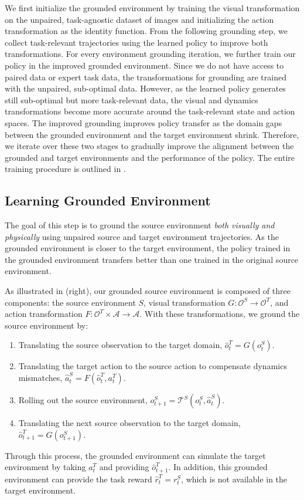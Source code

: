 We first initialize the grounded environment by training the visual transformation on the unpaired, task-agnostic dataset of images and initializing the action transformation as the identity function. From the following grounding step, we collect task-relevant trajectories using the learned policy to improve both transformations. For every environment grounding iteration, we further train our policy in the improved grounded environment.
Since we do not have access to paired data or expert task data, the transformations for grounding are trained with the unpaired, sub-optimal data. However, as the learned policy generates still sub-optimal but more task-relevant data, the visual and dynamics transformations become more accurate around the task-relevant state and action spaces. The improved grounding improves policy transfer as the domain gaps between the grounded environment and the target environment shrink. Therefore, we iterate over these two stages to gradually improve the alignment between the grounded and target environments and the performance of the policy. The entire training procedure is outlined in .


\subsection{Learning Grounded Environment}
\label{sec:grounded_environment}

The goal of this step is to ground the source environment \textit{both visually and physically} using unpaired source and target environment trajectories. 
As the grounded environment is closer to the target environment, the policy trained in the grounded environment transfers better than one trained in the original source environment.

As illustrated in  (right), our grounded source environment is composed of three components: the source environment $S$, visual transformation $G: \mathcal{O}^S \rightarrow \mathcal{O}^T$, and action transformation $F: \mathcal{O}^T \times \mathcal{A} \rightarrow \mathcal{A}$. 
With these transformations, we ground the source environment by:
\begin{enumerate}[label=(\arabic*)]
\item Translating the source observation to the target domain, $\hat{o}_t^T = G(o_t^S)$.
\item Translating the target action to the source action to compensate dynamics mismatches, $\hat{a}_t^S = F(\hat{o}_t^T, a_t^T)$.
\item Rolling out the source environment, $o_{t+1}^S = \mathcal{T}^S(o_t^S, \hat{a}_t^S)$. 
\item Translating the next source observation to the target domain, $\hat{o}_{t+1}^T = G(o_{t+1}^S)$. 
\end{enumerate}
Through this process, the grounded environment can simulate the target environment by taking $a_t^T$ and providing $\hat{o}_{t+1}^T$. In addition, this grounded environment can provide the task reward $\hat{r}_t^T = r_t^S$, which is not available in the target environment.

